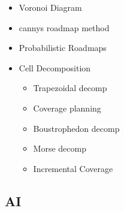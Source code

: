 \documentclass[a4paper,11pt]{article}
\begin{document}
\begin{itemize}
\begin{itemize}
            \item Voronoi Diagram
            \item cannys roadmap method
            \item Probabilistic Roadmaps
            \item Cell Decomposition
                \begin{itemize}
                    \item Trapezoidal decomp
                    \item Coverage planning
                    \item Boustrophedon decomp
                    \item Morse decomp
                    \item Incremental Coverage
                \end{itemize}
            \end{itemize}
    \end{itemize}

\subsection{AI}
\end{document}
